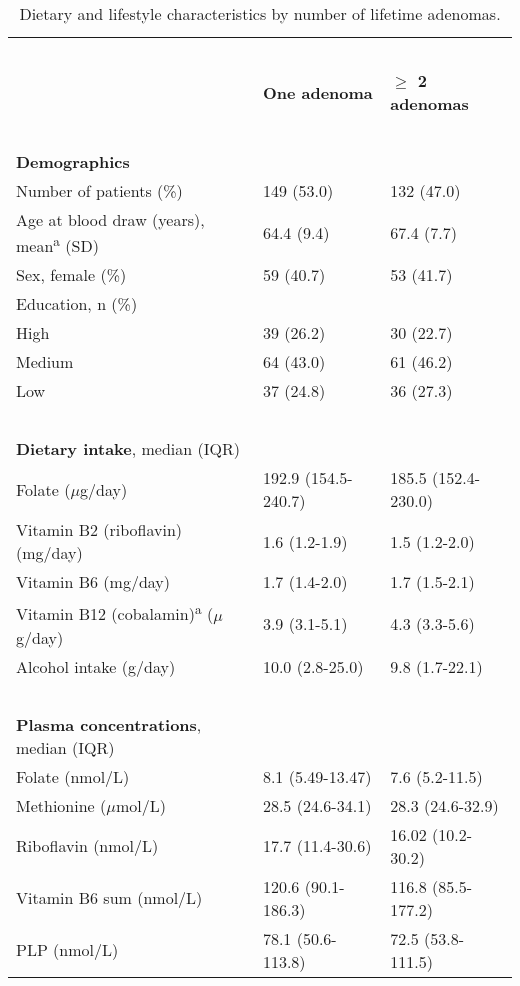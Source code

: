 \begin{table}
\caption{Dietary and lifestyle characteristics by number of lifetime adenomas.}
\label{table5_1}
\begin{adjustbox}{width=\textwidth}
\renewcommand{\arraystretch}{1.1}
\begin{tabular}{L{6.4cm}C{3cm}C{3cm}}
\hline
~ & ~ & ~ \\
~ & \bfseries\color{black} One adenoma & \bfseries\color{black} ${\geq}$ 2
adenomas\\
~ & ~ & ~ \\
\hline
\bfseries Demographics & ~ & ~ \\
Number of patients (\%) & 149 (53.0) & 132 (47.0)\\
Age at blood draw (years), mean\textsuperscript{a} (SD) & 64.4 (9.4) & 67.4 (7.7)\\
Sex, female (\%) & 59 (40.7) & 53 (41.7)\\
Education, n (\%) & ~ & ~ \\
\quad High & 39 (26.2) & 30 (22.7) \\
\quad Medium & 64 (43.0) & 61 (46.2) \\
\quad Low & 37 (24.8) & 36 (27.3) \\
~ & ~ & ~ \\
\textbf{Dietary intake}, median (IQR) & ~ & ~ \\
Folate (\textrm{${\mu}$}g/day) & 192.9 (154.5-240.7) & 185.5 (152.4-230.0)\\
Vitamin B2 (riboflavin) (mg/day) & 1.6 (1.2-1.9) & 1.5 (1.2-2.0)\\
Vitamin B6 (mg/day) & 1.7 (1.4-2.0) & 1.7 (1.5-2.1)\\
Vitamin B12 (cobalamin)\textsuperscript{a} (${\mu}$g/day) & 3.9 (3.1-5.1) & 4.3 (3.3-5.6)\\
Alcohol intake (g/day) & 10.0 (2.8-25.0) & 9.8 (1.7-22.1)\\
~ & ~ & ~ \\
\textbf{Plasma concentrations}, median (IQR) & ~ & ~ \\
Folate (nmol/L) & 8.1 (5.49-13.47) & 7.6 (5.2-11.5)\\
Methionine (\textrm{${\mu}$}mol/L) & 28.5 (24.6-34.1) & 28.3 (24.6-32.9)\\
Riboflavin (nmol/L) & 17.7 (11.4-30.6) & 16.02 (10.2-30.2)\\
Vitamin B6 sum (nmol/L) & 120.6 (90.1-186.3) & 116.8 (85.5-177.2)\\
PLP (nmol/L) & 78.1 (50.6-113.8) & 72.5 (53.8-111.5)\\

\end{tabular}
\end{adjustbox}
\end{table}

